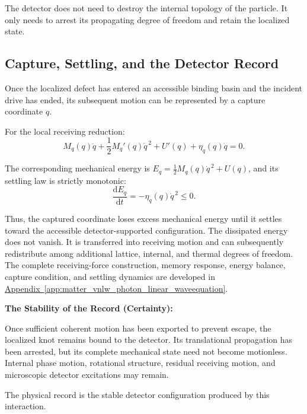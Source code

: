 The detector does not need to destroy the internal topology of the particle. It only needs to arrest its propagating degree of freedom and retain the localized state.

\subsection{Capture, Settling, and the Detector Record}

Once the localized defect has entered an accessible binding basin and the incident drive has ended, its subsequent motion can be represented by a capture coordinate $q$.

For the local receiving reduction:
\begin{equation}
    M_q(q)\ddot q
    +
    \frac{1}{2}M_q'(q)\dot q^{\,2}
    +
    U'(q)
    +
    \eta_q(q)\dot q
    =
    0.
\end{equation}

The corresponding mechanical energy is $E_q = \frac{1}{2}M_q(q)\dot q^{\,2} + U(q)$, and its settling law is strictly monotonic:
\begin{equation}
    \frac{\mathrm d E_q}{\mathrm dt}
    =
    -\eta_q(q)\dot q^{\,2}
    \leq
    0.
\end{equation}

Thus, the captured coordinate loses excess mechanical energy until it settles toward the accessible detector-supported configuration. The dissipated energy does not vanish. It is transferred into receiving motion and can subsequently redistribute among additional lattice, internal, and thermal degrees of freedom. The complete receiving-force construction, memory response, energy balance, capture condition, and settling dynamics are developed in \hyperref[app:matter_vnlw_photon_linear_waveequation]{Appendix~\ref*{app:matter_vnlw_photon_linear_waveequation}}.

\vspace{0.5em}
\noindent\textbf{The Stability of the Record (Certainty):}

Once sufficient coherent motion has been exported to prevent escape, the localized knot remains bound to the detector. Its translational propagation has been arrested, but its complete mechanical state need not become motionless. Internal phase motion, rotational structure, residual receiving motion, and microscopic detector excitations may remain.

The physical record is the stable detector configuration produced by this interaction.

